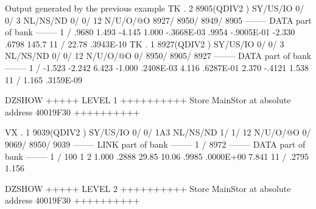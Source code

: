 \begin{Listing}{Output generated by the previous example}
 TK  .     2     8905(QDIV2   ) SY/US/IO    0/    0/   3 NL/NS/ND    0/    0/      12 N/U/O/@O    8927/    8950/    8949/    8905
--------  DATA part of bank  --------                                                                                            
      1 /   .9680       1.493      -4.145       1.000      -.3668E-03   .9954      -.9005E-01  -2.330       .6798       145.7    
     11 /   22.78       .3943E-10                                                                                                
 TK  .     1     8927(QDIV2   ) SY/US/IO    0/    0/   3 NL/NS/ND    0/    0/      12 N/U/O/@O       0/    8950/    8905/    8927
--------  DATA part of bank  --------                                                                                            
      1 /  -1.523      -2.242       6.423      -1.000       .2408E-03   4.116       .6287E-01   2.370      -.4121       1.538    
     11 /   1.165       .3159E-09                                                                                                
                                                                                                                                 
DZSHOW  +++++ LEVEL     1 ++++++++++            Store  MainStor at absolute address 40019F30      ++++++++++                     
                                                                                                                                 
 VX  .     1     9039(QDIV2   ) SY/US/IO    0/    0/ 1A3 NL/NS/ND    1/    1/      12 N/U/O/@O       0/    9069/    8950/    9039
--------  LINK part of bank  --------                                                                                            
      1 /        8972                                                                                                            
--------  DATA part of bank  --------                                                                                            
      1 /         100           1           2   1.000       .2888       29.85       10.06       .9985       .0000E+00   7.841    
     11 /   .2795       1.156                                                                                                    
                                                                                                                                 
DZSHOW  +++++ LEVEL     2 ++++++++++            Store  MainStor at absolute address 40019F30      ++++++++++                     
                                                                                                                                 

\end{Listing}
